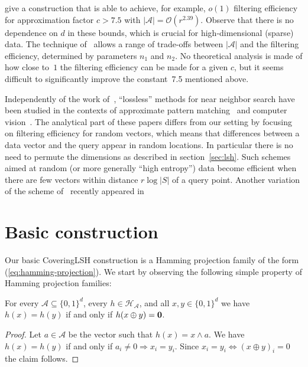 \documentclass[prodmode,acmtalg]{acmsmall}
\newcommand{\Osymbol}{{\mathcal O}}
\newcommand{\BO}[1]{\Osymbol\left(#1\right)}
\begin{document}
\cite{Arasu_VLDB06} give a construction that is able to achieve, for example, $o(1)$ filtering efficiency for approximation factor $c > 7.5$ with $|\mathcal{A}| = \BO{r^{2.39}}$.
Observe that there is no dependence on $d$ in these bounds, which is crucial for high-dimensional (sparse) data.
The technique of~\cite{Arasu_VLDB06} allows a range of trade-offs between $|\mathcal{A}|$ and the filtering efficiency, determined by parameters $n_1$ and $n_2$.
No theoretical analysis is made of how close to~$1$ the filtering efficiency can be made for a given $c$, but it seems difficult to significantly improve the constant~7.5 mentioned above.

Independently of the work of~\cite{Arasu_VLDB06}, ``lossless'' methods for near neighbor search have been studied in the contexts of approximate pattern matching~\cite{kucherov2005multiseed} and computer vision~\cite{norouzi2012fast}.
The analytical part of these papers differs from our setting by focusing on filtering efficiency for random vectors, which means that differences between a data vector and the query appear in random locations. 
In particular there is no need to permute the dimensions as described in section~\ref{sec:lsh}.
Such schemes aimed at random (or more generally ``high entropy'') data become efficient when there are few vectors within distance $r \log |S|$ of a query point.
Another variation of the scheme of~\cite{Arasu_VLDB06} recently appeared in~\cite{DBLP:journals/pvldb/DengLWF15}



\section{Basic construction}\label{sec:basic}

Our basic CoveringLSH construction is a Hamming projection family of the form (\ref{eq:hamming-projection}).
We start by observing the following simple property of Hamming projection families:

\begin{lemma}\label{lem:xor}
For every $\mathcal{A}\subseteq \{0,1\}^d$, every $h\in \mathcal{H}_\mathcal{A}$, and all $x,y\in \{0,1\}^d$ we have $h(x)=h(y)$ if and only if $h(x\oplus y) = {\bf 0}$.
\end{lemma}
\begin{proof}
Let $a\in \mathcal{A}$ be the vector such that $h(x) = x \wedge a$.
We have $h(x)=h(y)$ if and only if $a_i \ne 0 \Rightarrow x_i = y_i$. 
Since $x_i = y_i \Leftrightarrow (x \oplus y)_i = 0$ the claim follows. 
\end{proof}
\end{document}
